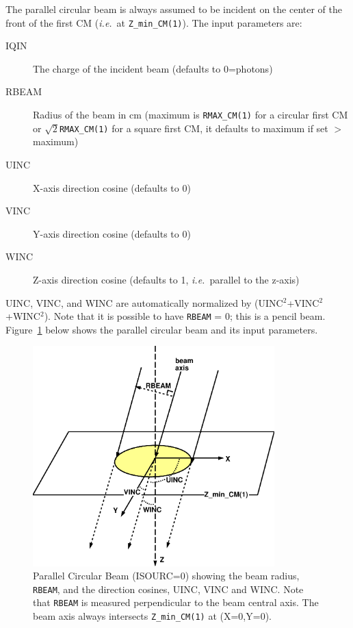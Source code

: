 \documentclass[12pt,twoside]{article}
\newcommand{\ie}{{\em i.e.}}
\begin{document}
The parallel circular beam is always assumed to be incident on the
center of the front
of the first CM (\ie\ at \verb+Z_min_CM(1)+).  The input parameters are:
\begin{description}
\item [IQIN] The charge of the incident beam (defaults to 0=photons)
\item [RBEAM] Radius of the beam in cm (maximum is \verb+RMAX_CM(1)+
 for a circular first CM or
$\sqrt{2}$\verb+RMAX_CM(1)+ for a square first CM,
it defaults to maximum if set $>$
maximum)
\item [UINC] X-axis direction cosine (defaults to 0)
\item [VINC] Y-axis direction cosine (defaults to 0)
\item [WINC] Z-axis direction cosine (defaults to 1, \ie\ parallel to
the z-axis)
\end{description}
UINC, VINC, and WINC are automatically normalized by
(UINC$^2$+VINC$^2$+WINC$^2$).
Note that it is possible to have \verb+RBEAM+ = 0; this is a pencil beam.
Figure~\ref{fig_src0} below shows the parallel circular beam and its input parameters.
\begin{figure}[htbp]
\begin{center}
\leavevmode
\mbox{}\hspace{0cm}
\includegraphics[height=8.5cm]{figures/src0}
\caption[ISOURC=0: Parallel circular beam.]
{Parallel Circular Beam (ISOURC=0) showing the beam radius,
{\tt RBEAM}, and the
direction cosines, UINC, VINC and WINC.  Note that {\tt RBEAM} is measured perpendicular
to the beam central axis.  The beam axis always intersects {\tt Z\_min\_CM(1)}
 at (X=0,Y=0).}
\label{fig_src0}
\end{center}
\end{figure}
\end{document}
